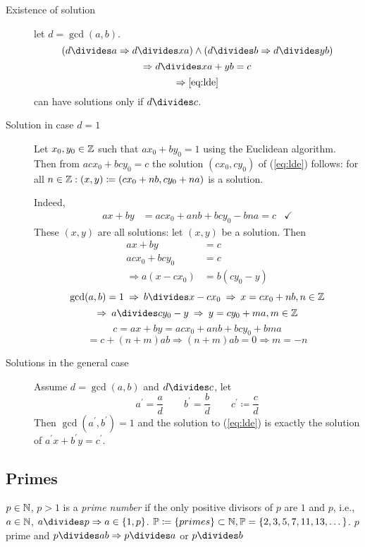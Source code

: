 \documentclass[NumTh.tex]{subfiles}
\begin{document}
\begin{description}
  \item[Existence of solution] let $d = \gcd(a,b)$.
    \[
	    (d\divides a \Rightarrow d\divides xa) \land
	    (d\divides b \Rightarrow d\divides yb)
	\] \[
	    \Rightarrow d\divides xa+yb = c \\
	\] \[
	    \Rightarrow \cref{eq:lde}
	\]
	can have solutions only if $d\divides c$.

  \item[Solution in case $d=1$]
    Let $x_0,y_0 \in \mathbb{Z}$ such that $ax_0+by_0 = 1$ using the Euclidean algorithm.
    Then from $acx_0 + bcy_0 = c$ the solution $(cx_0, cy_0)$ of (\cref{eq:lde})
    follows: for all $n \in \mathbb{Z}: (x,y) \coloneq (cx_0+nb,cy_0+na)$ is a solution.
  
	Indeed,
	\begin{align*}
	  ax+by &= acx_0 + anb + bcy_0 - bna = c &\checkmark
	\end{align*}
    These $(x,y)$ are all solutions: let $(x,y)$ be a solution. Then
	\begin{align*}
	   ax + by &= c \\
	   acx_0 + bcy_0 &= c \\
	   \Rightarrow a(x-cx_0) &= b(cy_0-y)
	\end{align*}
	\[ \gcd(a,b) = 1 \:\Rightarrow\: b \divides x - cx_0 \:\Rightarrow\: x = cx_0 + nb, n \in \Z \]
	\[ \Rightarrow\: a \divides cy_0 - y \:\Rightarrow\: y = cy_0 + ma, m\in \Z \]
    \[ c = ax+by = acx_0 + anb + bcy_0 + bma \]
    \[ = c + (n+m)ab \Rightarrow (n+m)ab = 0 \Rightarrow m = -n \]
  
  \item[Solutions in the general case] Assume $d = \gcd(a,b)$ and $d\divides c$, let
    \[
		a^\prime = \frac{a}{d} \hspace{25pt}
		b^\prime = \frac{b}{d} \hspace{25pt}
		c^\prime \coloneq \frac{c}{d}
	\]
    Then $\gcd(a^\prime, b^\prime) = 1$ and the solution to (\cref{eq:lde}) is exactly the solution of $a^\prime x + b^\prime y = c^\prime$.
\end{description}

\subsection{Primes}

\begin{defi}
$p \in \mathbb{N}$, $p > 1$ is a \emph{prime number} if the only positive divisors of $p$ are $1$ and $p$, i.e., $a \in \mathbb{N}$, $a\divides p \Rightarrow a \in \{1,p\}$.
$\mathbb{P} \coloneq \{ primes\} \subset \mathbb{N}, \mathbb{P} = \{2,3,5,7,11,13,\dots\}$.
$p$ prime and $p\divides ab \Rightarrow p\divides a$ or $p\divides b$
\end{defi}
\end{document}
